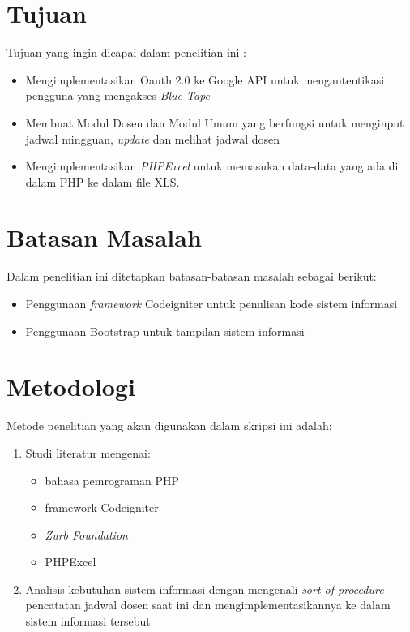 
\section{Tujuan}
\label{sec:tujuan}
Tujuan yang ingin dicapai dalam penelitian ini : 
	\begin{itemize}
		\item Mengimplementasikan Oauth 2.0 ke Google API untuk mengautentikasi pengguna yang mengakses \textit{Blue Tape}
		\item Membuat Modul Dosen dan Modul Umum yang berfungsi untuk menginput jadwal mingguan, \textit{update} dan melihat jadwal dosen
		\item Mengimplementasikan \textit{PHPExcel} untuk memasukan data-data yang ada di dalam PHP ke dalam file XLS. 

	\end{itemize}


\section{Batasan Masalah}
\label{sec:batasan}
Dalam penelitian ini ditetapkan batasan-batasan masalah sebagai berikut:
\begin{itemize}
	\item Penggunaan \textit{framework} Codeigniter untuk penulisan kode sistem informasi
	\item Penggunaan Bootstrap untuk tampilan sistem informasi
\end{itemize}

\section{Metodologi}
\label{sec:metlit}
Metode penelitian yang akan digunakan dalam skripsi ini adalah:
\begin{enumerate}
   \item Studi literatur mengenai:
   		\begin{itemize}
 		\item bahasa pemrograman PHP
 		\item framework Codeigniter
 		\item \textit{Zurb Foundation}
 		\item PHPExcel
		\end{itemize}
   \item Analisis kebutuhan sistem informasi dengan mengenali \textit{sort of procedure} pencatatan jadwal dosen saat ini dan mengimplementasikannya ke dalam sistem informasi tersebut
\end{enumerate}
 

